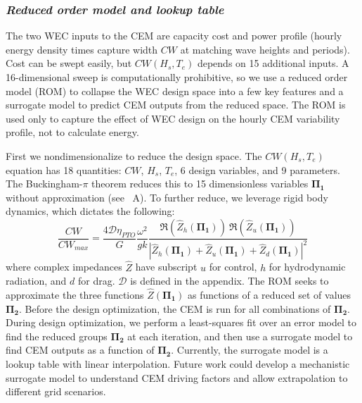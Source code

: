 \documentclass[10pt,twoside]{article}
\begin{document}
\subsubsection{\textit{Reduced order model and lookup table}}
The two WEC inputs to the CEM are capacity cost and power profile (hourly energy density times capture width $CW$ at matching wave heights and periods).
Cost can be swept easily, but $CW(H_s,T_e)$ depends on 15 additional inputs. 
A 16-dimensional sweep is computationally prohibitive, so we use a reduced order model (ROM) to collapse the WEC design space into a few key features and a surrogate model to predict CEM outputs from the reduced space.
The ROM is used only to capture the effect of WEC design on the hourly CEM variability profile, not to calculate energy.

First we nondimensionalize to reduce the design space.
The $CW(H_s,T_e)$ equation has 18 quantities: $CW$, $H_s$, $T_e$, 6 design variables, and 9 parameters.
The Buckingham-$\pi$ theorem reduces this to 15 dimensionless variables $\mathbf{\Pi_1}$ without approximation (see \appendixname~A).
To further reduce, we leverage rigid body dynamics, which dictates the following:
\begin{equation}
    \label{eq:CW-fraction}
    \frac{CW}{CW_{max}} = \frac{4 \mathcal{D}\eta_{PTO}}{G} \frac{\omega^2}{g k}  \frac{\Re(\hat{Z}_h(\mathbf{\Pi_1}))~ \Re(\hat{Z}_u(\mathbf{\Pi_1}))}{\left|\hat{Z}_h(\mathbf{\Pi_1})+\hat{Z}_u(\mathbf{\Pi_1})+\hat{Z}_d(\mathbf{\Pi_1})\right|^2}
\end{equation}
where complex impedances $\hat{Z}$ have subscript $u$ for control, $h$ for hydrodynamic radiation, and $d$ for drag.
$\mathcal{D}$ is defined in the appendix.
The ROM seeks to approximate the three functions $\hat{Z}(\mathbf{\Pi_1})$ as functions of a reduced set of values $\mathbf{\Pi_2}$.
Before the design optimization, the CEM is run for all combinations of $\mathbf{\Pi_2}$.
During design optimization, we perform a least-squares fit over an error model to find the reduced groups $\mathbf{\Pi_2}$ at each iteration, and then use a surrogate model to find CEM outputs as a function of $\mathbf{\Pi_2}$. 
Currently, the surrogate model is a lookup table with linear interpolation.
Future work could develop a mechanistic surrogate model to understand CEM driving factors and allow extrapolation to different grid scenarios.
\end{document}
